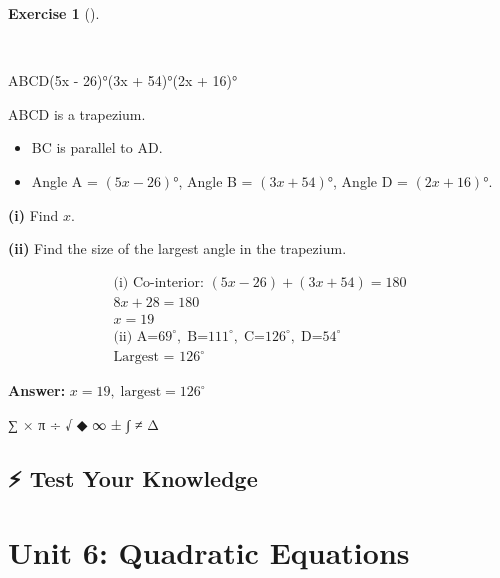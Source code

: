 \documentclass[
  letterpaper,
  DIV=11,
  numbers=noendperiod]{scrreprt}
\providecommand{\tightlist}{%
  \setlength{\itemsep}{0pt}\setlength{\parskip}{0pt}}
\theoremstyle{definition}
\newtheorem{exercise}{Exercise}[chapter]
\theoremstyle{remark}
\begin{document}
\begin{exercise}[]\protect\hypertarget{exr-u5-20-2}{}\label{exr-u5-20-2}

~

ABCD(5x - 26)°(3x + 54)°(2x + 16)°

ABCD is a trapezium.

\begin{itemize}
\tightlist
\item
  BC is parallel to AD.
\item
  Angle A = \((5x - 26)°\), Angle B = \((3x + 54)°\), Angle D =
  \((2x + 16)°\).
\end{itemize}

\textbf{(i)} Find \(x\).

\textbf{(ii)} Find the size of the largest angle in the trapezium.

\begin{tcolorbox}[enhanced jigsaw, opacitybacktitle=0.6, coltitle=black, arc=.35mm, colframe=quarto-callout-tip-color-frame, colback=white, bottomrule=.15mm, left=2mm, colbacktitle=quarto-callout-tip-color!10!white, titlerule=0mm, opacityback=0, title=\textcolor{quarto-callout-tip-color}{\faLightbulb}\hspace{0.5em}{🔍 View Solution}, leftrule=.75mm, breakable, rightrule=.15mm, bottomtitle=1mm, toptitle=1mm, toprule=.15mm]

\begin{align*}
\text{(i) Co-interior: } (5x-26) + (3x+54) = 180 \\ 8x + 28 = 180 \\ x = 19 \\ \text{(ii) } \text{A=}69^\circ,\; \text{B=}111^\circ,\; \text{C=}126^\circ,\; \text{D=}54^\circ \\ \text{Largest = }126^\circ
\end{align*}

\textbf{Answer:} \(x=19,\; \text{largest} = 126^\circ\)

\end{tcolorbox}

\end{exercise}

∑ × π ÷ √ ◆ ∞ ± ∫ ≠ Δ

\section{⚡ Test Your Knowledge}\label{test-your-knowledge}

\chapter{Unit 6: Quadratic Equations}\label{unit-6-quadratic-equations}
\end{document}
